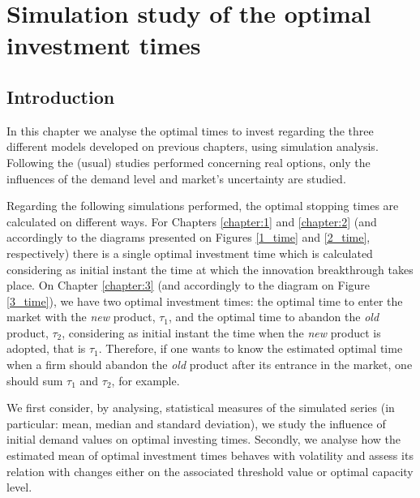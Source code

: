 \chapter{%
Simulation study of the optimal investment times}
\label{chapter:stoptime}



\section{Introduction}
\label{section:stoptime_intro}

In this chapter we analyse the optimal times to invest regarding the three different models developed on previous chapters, using simulation analysis. Following the (usual) studies performed concerning real options, only the influences of the demand level and market's uncertainty are studied.

Regarding the following simulations performed, the optimal stopping times are calculated on different ways.
For Chapters \ref{chapter:1} and \ref{chapter:2} (and accordingly to the diagrams presented on Figures \ref{1_time} and \ref{2_time}, respectively) there is a single optimal investment time which is calculated considering as initial instant the time at which the innovation breakthrough takes place.
On Chapter \ref{chapter:3} (and accordingly to the diagram on Figure \ref{3_time}), we have two optimal investment times: the optimal time to enter the market with the \textit{new} product, $\tau_1$, and the optimal time to abandon the \textit{old} product, $\tau_2$, considering as initial instant the time when the \textit{new} product is adopted, that is $\tau_1$. Therefore, if one wants to know the estimated optimal time when a firm should abandon the \textit{old} product after its entrance in the market, one should sum $\tau_1$ and $\tau_2$, for example.


We first consider, by analysing, statistical measures of the simulated series (in particular: mean, median and standard deviation), we study the influence of initial demand values on optimal investing times.
Secondly, we analyse how the estimated mean of optimal investment times behaves with volatility and assess its relation with changes  either on the associated threshold value or optimal capacity level.

